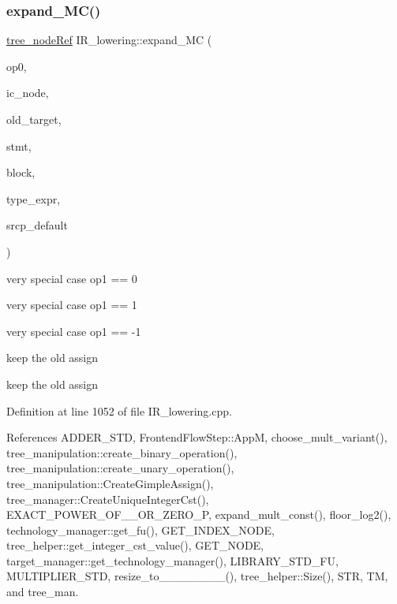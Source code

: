 \subsubsection{\texorpdfstring{expand\+\_\+\+M\+C()}{expand\_MC()}}
{\footnotesize\ttfamily \hyperlink{tree__node_8hpp_a6ee377554d1c4871ad66a337eaa67fd5}{tree\+\_\+node\+Ref} I\+R\+\_\+lowering\+::expand\+\_\+\+MC (\begin{DoxyParamCaption}\item[{\hyperlink{tree__node_8hpp_a6ee377554d1c4871ad66a337eaa67fd5}{tree\+\_\+node\+Ref}}]{op0,  }\item[{\hyperlink{structinteger__cst}{integer\+\_\+cst} $\ast$}]{ic\+\_\+node,  }\item[{\hyperlink{tree__node_8hpp_a6ee377554d1c4871ad66a337eaa67fd5}{tree\+\_\+node\+Ref}}]{old\+\_\+target,  }\item[{const \hyperlink{tree__node_8hpp_a6ee377554d1c4871ad66a337eaa67fd5}{tree\+\_\+node\+Ref}}]{stmt,  }\item[{const bloc\+Ref}]{block,  }\item[{\hyperlink{tree__node_8hpp_a6ee377554d1c4871ad66a337eaa67fd5}{tree\+\_\+node\+Ref} \&}]{type\+\_\+expr,  }\item[{const std\+::string \&}]{srcp\+\_\+default }\end{DoxyParamCaption})\hspace{0.3cm}{\ttfamily [private]}}

very special case op1 == 0

very special case op1 == 1

very special case op1 == -\/1

keep the old assign

keep the old assign 

Definition at line 1052 of file I\+R\+\_\+lowering.\+cpp.



References A\+D\+D\+E\+R\+\_\+\+S\+TD, Frontend\+Flow\+Step\+::\+AppM, choose\+\_\+mult\+\_\+variant(), tree\+\_\+manipulation\+::create\+\_\+binary\+\_\+operation(), tree\+\_\+manipulation\+::create\+\_\+unary\+\_\+operation(), tree\+\_\+manipulation\+::\+Create\+Gimple\+Assign(), tree\+\_\+manager\+::\+Create\+Unique\+Integer\+Cst(), E\+X\+A\+C\+T\+\_\+\+P\+O\+W\+E\+R\+\_\+\+O\+F\+\_\+\_\+\+O\+R\+\_\+\+Z\+E\+R\+O\+\_\+P, expand\+\_\+mult\+\_\+const(), floor\+\_\+log2(), technology\+\_\+manager\+::get\+\_\+fu(), G\+E\+T\+\_\+\+I\+N\+D\+E\+X\+\_\+\+N\+O\+DE, tree\+\_\+helper\+::get\+\_\+integer\+\_\+cst\+\_\+value(), G\+E\+T\+\_\+\+N\+O\+DE, target\+\_\+manager\+::get\+\_\+technology\+\_\+manager(), L\+I\+B\+R\+A\+R\+Y\+\_\+\+S\+T\+D\+\_\+\+FU, M\+U\+L\+T\+I\+P\+L\+I\+E\+R\+\_\+\+S\+TD, resize\+\_\+to\+\_\+\_\+\_\+\_\+\_\+\_\+\_\+\_(), tree\+\_\+helper\+::\+Size(), S\+TR, TM, and tree\+\_\+man.



